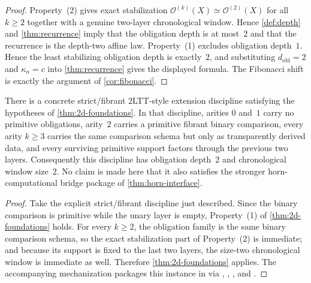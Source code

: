 \documentclass{lmcs}
\newcommand{\Ocal}{\mathcal{O}}
\begin{document}
\begin{proof}
Property~(2) gives exact stabilization $\Ocal^{(k)}(X) \simeq \Ocal^{(2)}(X)$ for all $k \geq 2$ together with a genuine two-layer chronological window. Hence \autoref{def:depth} and \autoref{thm:recurrence} imply that the obligation depth is at most~$2$ and that the recurrence is the depth-two affine law. Property~(1) excludes obligation depth~$1$. Hence the least stabilizing obligation depth is exactly~$2$, and substituting $d_{\mathrm{obl}}=2$ and $\kappa_n=c$ into \autoref{thm:recurrence} gives the displayed formula. The Fibonacci shift is exactly the argument of \autoref{cor:fibonacci}.
\end{proof}

\begin{cor}
\label{cor:2ltt-instantiation}
There is a concrete strict/fibrant $2$LTT-style extension discipline satisfying the hypotheses of \autoref{thm:2d-foundations}. In that discipline, arities $0$ and~$1$ carry no primitive obligations, arity~$2$ carries a primitive fibrant binary comparison, every arity $k \geq 3$ carries the same comparison schema but only as transparently derived data, and every surviving primitive support factors through the previous two layers. Consequently this discipline has obligation depth~$2$ and chronological window size~$2$. No claim is made here that it also satisfies the stronger horn-computational bridge package of \autoref{thm:horn-interface}.
\end{cor}

\begin{proof}
Take the explicit strict/fibrant discipline just described. Since the binary comparison is primitive while the unary layer is empty, Property~(1) of \autoref{thm:2d-foundations} holds. For every $k \geq 2$, the obligation family is the same binary comparison schema, so the exact stabilization part of Property~(2) is immediate; and because its support is fixed to the last two layers, the size-two chronological window is immediate as well. Therefore \autoref{thm:2d-foundations} applies. The accompanying mechanization packages this instance in  via , , , and .
\end{proof}
\end{document}

